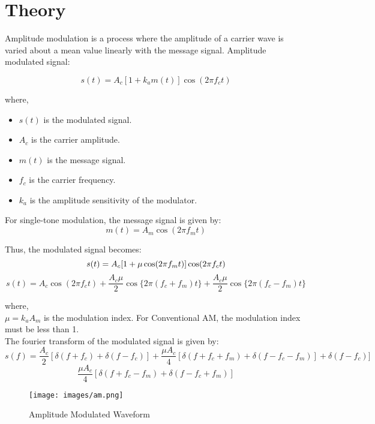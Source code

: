 \section*{Theory}

Amplitude modulation is a process where the amplitude of a carrier
wave is varied about a mean value linearly with the message signal. Amplitude modulated signal:

\begin{equation}
    s(t) = A_c[1 + k_a m(t)]\cos(2\pi f_c t)
\end{equation}

where,\\
\begin{itemize}
    \item $s(t)$ is the modulated signal.
    \item $A_c$ is the carrier amplitude.
    \item $m(t)$ is the message signal.
    \item $f_c$ is the carrier frequency.
    \item $k_a$ is the amplitude sensitivity of the modulator.
\end{itemize}

For single-tone modulation, the message signal is given by:
\begin{equation}
    m(t) = A_m \cos(2\pi f_m t)
\end{equation}

Thus, the modulated signal becomes:
\begin{equation}
    s(t) = A_c[1 + \mu \cos(2\pi f_m t)]\cos(2\pi f_c t) \\
\end{equation}
\begin{equation}
    s(t) = A_c\cos(2\pi f_c t) + \frac{A_c\mu}{2}\cos\{2\pi (f_c + f_m) t\} + \frac{A_c\mu}{2}\cos\{2\pi (f_c - f_m) t\}
\end{equation}

where,\\
$\mu = k_a A_m$ is the modulation index.
For Conventional AM, the modulation index must be less than 1.\\

The fourier transform of the modulated signal is given by:
\[
    s(f)=\frac{A_c}{2}[\delta(f+f_c) + \delta(f-f_c)] + \frac{\mu A_c}{4}[\delta(f+f_c+f_m) + \delta(f-f_c-f_m)] + \delta(f-f_c)] 
\]
\begin{equation}
    \frac{\mu A_c}{4}[\delta(f+f_c-f_m) + \delta(f-f_c+f_m)]
\end{equation}

\begin{figure}
    \centering
    \texttt{[image: images/am.png]}
    \caption{Amplitude Modulated Waveform}
    \label{fig:am_waveform}
\end{figure}

